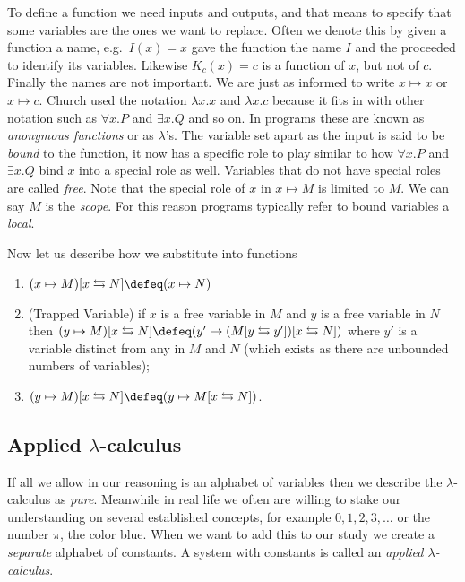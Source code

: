 To define a function we need inputs and outputs, and that means to specify 
that some variables are the ones we want to replace.  Often 
we denote this by given a function a name, e.g.\ $I(x)=x$ gave the 
function the name $I$ and the proceeded to identify its variables.
Likewise $K_c(x)=c$ is a function of $x$, but not of $c$.  Finally the names are not important.  We are just as informed to write $x\mapsto x$ or $x\mapsto c$.  Church used the notation $\lambda x.x$ and $\lambda x.c$
because it fits in with other notation such as $\forall x.P$ and $\exists x.Q$ and so on.  In programs these are known as \emph{anonymous functions} or as $\lambda$'s.   The variable set apart as the input is said to be \emph{bound}
to the function, it now has a specific role to play similar to how $\forall x.P$  and $\exists x.Q$ bind $x$ into a special role as well.  Variables 
that do not have special roles are called \emph{free}.  Note that the special 
role of $x$ in $x\mapsto M$ is limited to $M$.  We can say $M$ is the \emph{scope}.  For this reason programs typically refer to bound variables a 
\emph{local}.

Now let us describe how we substitute into functions
\begin{enumerate}
    \item $(x\mapsto M)[x\leftrightarrows N]\defeq (x\mapsto N)$
    \item (Trapped Variable) 
    if $x$ is a free variable in $M$ and $y$ is a free variable in $N$ then 
    $(y\mapsto M)[x\leftrightarrows N]\defeq (y'\mapsto (M[y\leftrightarrows y'])[x\leftrightarrows N])$ where 
    $y'$ is a variable distinct from any in $M$ and $N$ (which exists 
    as there are unbounded numbers of variables);

    \item $(y\mapsto M)[x\leftrightarrows N]\defeq (y\mapsto M[x\leftrightarrows N])$.
\end{enumerate}

\subsection{Applied $\lambda$-calculus}
If all we allow in our reasoning is an alphabet of variables then we describe
the $\lambda$-calculus as \emph{pure}.  Meanwhile in real life we often are
willing to stake our understanding on several established concepts, for example
$0,1,2,3,\ldots$ or the number $\pi$, the color blue.  When we want to add this
to our study we create a \emph{separate} alphabet of constants.  A system with
constants is called an \emph{applied $\lambda$-calculus}.

